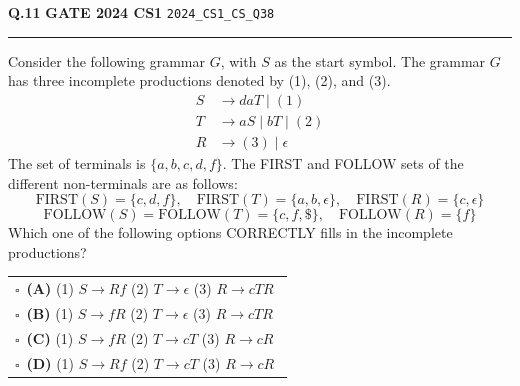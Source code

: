 \documentclass[a4paper,10pt]{article}
\begin{document}
\begin{tcolorbox}[
    blanker,
    sidebyside,
    sidebyside align=top,
    lefthand width=0.55\textwidth,
    top=4pt, bottom=4pt, left=0pt, right=0pt,
    middle=16pt,
    underlay={
        \draw[dashed, black!80, line width=0.8pt, dash pattern=on 4pt off 3pt]
            ([xshift=0.55\textwidth+8pt]frame.north west) --
            ([xshift=0.55\textwidth+8pt]frame.south west);
    }
]
\textbf{Q.11}  \hfill {\footnotesize\textbf{GATE 2024 CS1} \quad \tiny\texttt{2024\_CS1\_CS\_Q38}}
\vspace{2pt}\hrule height 0.3pt\vspace{4pt}

Consider the following grammar $G$, with $S$ as the start symbol. The grammar $G$ has three incomplete productions denoted by (1), (2), and (3).
\begin{align*}
S &\to daT \mid (1) \\
T &\to aS \mid bT \mid (2) \\
R &\to (3) \mid \epsilon
\end{align*}
The set of terminals is $\{a, b, c, d, f\}$. The FIRST and FOLLOW sets of the different non-terminals are as follows:
$$\text{FIRST}(S) = \{c, d, f\}, \quad \text{FIRST}(T) = \{a, b, \epsilon\}, \quad \text{FIRST}(R) = \{c, \epsilon\}$$
$$\text{FOLLOW}(S) = \text{FOLLOW}(T) = \{c, f, \$\}, \quad \text{FOLLOW}(R) = \{f\}$$
Which one of the following options CORRECTLY fills in the incomplete productions?

\par\vspace{6pt}\noindent
\begin{tabular}{@{}p{0.98\linewidth}@{}}
$\square$\ \textbf{(A)} (1) $S \to Rf$ (2) $T \to \epsilon$ (3) $R \to cTR$ \\
\addlinespace[3pt]
$\square$\ \textbf{(B)} (1) $S \to fR$ (2) $T \to \epsilon$ (3) $R \to cTR$ \\
\addlinespace[3pt]
$\square$\ \textbf{(C)} (1) $S \to fR$ (2) $T \to cT$ (3) $R \to cR$ \\
\addlinespace[3pt]
$\square$\ \textbf{(D)} (1) $S \to Rf$ (2) $T \to cT$ (3) $R \to cR$
\end{tabular}

\tcblower


\end{tcolorbox}
\end{document}
